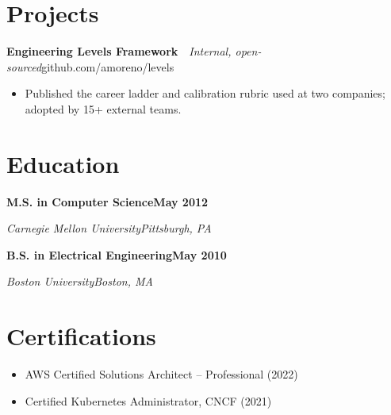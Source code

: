 \documentclass[letterpaper,11pt]{article}
\newcommand{\rProject}[3]{%
  \vspace{4pt}%
  \noindent\textbf{#1}\ \textbar\ \textit{\color{muted}#2}\hfill#3\par
  \vspace{2pt}%
}
\newcommand{\rEdu}[4]{%
  \vspace{4pt}%
  \noindent\textbf{#1}\hfill\textbf{#4}\par
  \noindent\textit{\color{muted}#2}\hfill\textit{\color{muted}#3}\par
  \vspace{2pt}%
}
\newenvironment{rBullets}
  {\begin{itemize}[leftmargin=14pt,itemsep=3pt,parsep=0pt,topsep=3pt,
                   partopsep=0pt,label=\textbullet]}
  {\end{itemize}}
\begin{document}
\section{Projects}

\rProject{Engineering Levels Framework}{Internal, open-sourced}{github.com/amoreno/levels}
\begin{rBullets}
  \item Published the career ladder and calibration rubric used at two companies; adopted by 15+ external teams.
\end{rBullets}

\section{Education}
\rEdu{M.S. in Computer Science}{Carnegie Mellon University}{Pittsburgh, PA}{May 2012}
\rEdu{B.S. in Electrical Engineering}{Boston University}{Boston, MA}{May 2010}

\section{Certifications}
\begin{rBullets}
  \item AWS Certified Solutions Architect -- Professional (2022)
  \item Certified Kubernetes Administrator, CNCF (2021)
\end{rBullets}
\end{document}
